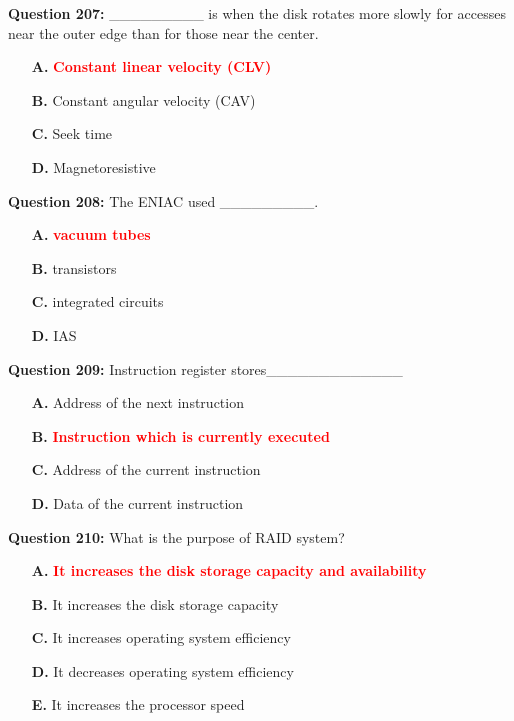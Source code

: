 \documentclass[12pt,a4paper]{article}
\begin{document}
\vspace{0.5cm}

\textbf{Question 207:} _________ is when the disk rotates more slowly for accesses near the outer edge than for those near the center.

\begin{itemize}
    \item[\textbf{A.}] \textcolor{red}{\textbf{Constant linear velocity (CLV)}}
    \item[\textbf{B.}] Constant angular velocity (CAV)
    \item[\textbf{C.}] Seek time
    \item[\textbf{D.}] Magnetoresistive
\end{itemize}

\vspace{0.5cm}

\textbf{Question 208:} The ENIAC used _________.

\begin{itemize}
    \item[\textbf{A.}] \textcolor{red}{\textbf{vacuum tubes}}
    \item[\textbf{B.}] transistors
    \item[\textbf{C.}] integrated circuits
    \item[\textbf{D.}] IAS
\end{itemize}

\vspace{0.5cm}

\textbf{Question 209:} Instruction register stores_____________

\begin{itemize}
    \item[\textbf{A.}] Address of the next instruction
    \item[\textbf{B.}] \textcolor{red}{\textbf{Instruction which is currently executed}}
    \item[\textbf{C.}] Address of the current instruction
    \item[\textbf{D.}] Data of the current instruction
\end{itemize}

\vspace{0.5cm}

\textbf{Question 210:} What is the purpose of RAID system?

\begin{itemize}
    \item[\textbf{A.}] \textcolor{red}{\textbf{It increases the disk storage capacity and availability}}
    \item[\textbf{B.}] It increases the disk storage capacity
    \item[\textbf{C.}] It increases operating system efficiency
    \item[\textbf{D.}] It decreases operating system efficiency
    \item[\textbf{E.}] It increases the processor speed
\end{itemize}
\end{document}
